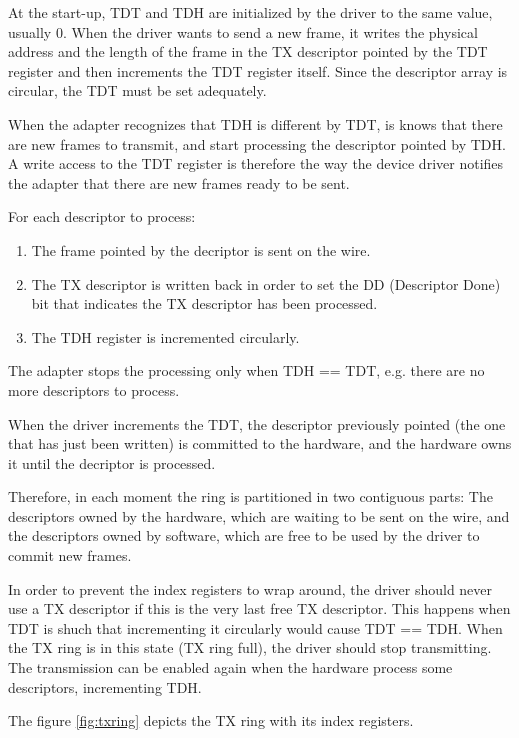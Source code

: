 \vspace{0.5cm}

At the start-up, TDT and TDH are initialized by the driver to the same value, usually 0. When the driver wants to send a new frame,
it writes the physical address and the length of the frame in the TX descriptor pointed by the TDT register and then increments the TDT
register itself. Since the descriptor array is circular, the TDT must be set adequately.

When the adapter recognizes that TDH is different by TDT, is knows that there are new frames to transmit, and start processing the
descriptor pointed by TDH. A write access to the TDT register is therefore the way the device driver notifies the adapter that 
there are new frames ready to be sent.

For each descriptor to process:
\begin{enumerate}
  \item The frame pointed by the decriptor is sent on the wire.
  \item The TX descriptor is written back in order to set the DD (Descriptor Done) bit that indicates the TX descriptor has been
	processed.
  \item The TDH register is incremented circularly.
\end{enumerate}
The adapter stops the processing only when TDH == TDT, e.g. there are no more descriptors to process.

When the driver increments the TDT, the descriptor previously pointed (the one that has just been written) is committed to the hardware,
and the hardware owns it until the decriptor is processed.

Therefore, in each moment the ring is partitioned in two contiguous parts: The descriptors owned by the hardware, which are waiting
to be sent on the wire, and the descriptors owned by software, which are free to be used by the driver to commit new frames.

In order to prevent the index registers to wrap around, the driver should never use a TX descriptor if this is the very last free
TX descriptor. This happens when TDT is shuch that incrementing it circularly would cause TDT == TDH. When the TX ring is in this
state (TX ring full), the driver should stop transmitting. The transmission can be enabled again when the hardware process some descriptors,
incrementing TDH.

The figure \ref{fig:txring} depicts the TX ring with its index registers.

